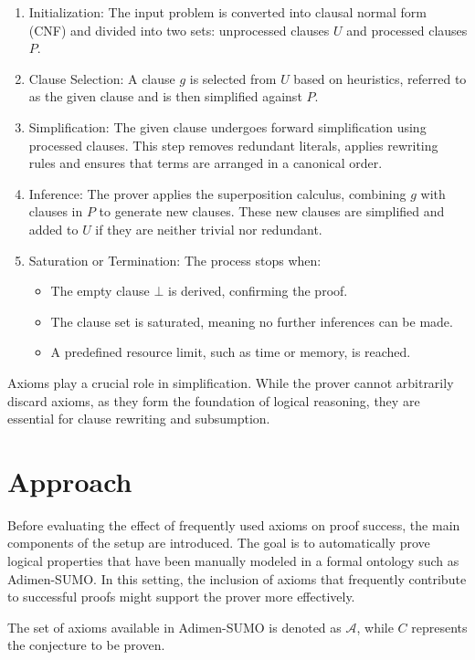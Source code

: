 \documentclass[english,version-2020-11]{uzl-thesis}
\begin{document}
\begin{enumerate}
    \item Initialization: The input problem is converted into clausal normal form (CNF) and divided into two sets: unprocessed clauses \( U \) and processed clauses \( P \).
    \item Clause Selection: A clause \( g \) is selected from \( U \) based on heuristics, referred to as the given clause and is then simplified against \( P \).
    \item Simplification: The given clause undergoes forward simplification using processed clauses. This step removes redundant literals, applies rewriting rules and ensures that terms are arranged in a canonical order.
    \item Inference: The prover applies the superposition calculus, combining \( g \) with clauses in \( P \) to generate new clauses. These new clauses are simplified and added to \( U \) if they are neither trivial nor redundant.
    \item Saturation or Termination: The process stops when:
    \begin{itemize}
        \item The empty clause \( \bot \) is derived, confirming the proof.
        \item The clause set is saturated, meaning no further inferences can be made.
        \item A predefined resource limit, such as time or memory, is reached.
    \end{itemize}
\end{enumerate}

Axioms play a crucial role in simplification. While the prover cannot arbitrarily discard axioms, as they form the foundation of logical reasoning, they are essential for clause rewriting and subsumption.


\section{Approach}

Before evaluating the effect of frequently used axioms on proof success, the main components of the setup are introduced. The goal is to automatically prove logical properties that have been manually modeled in a formal ontology such as Adimen-SUMO. In this setting, the inclusion of axioms that frequently contribute to successful proofs might support the prover more effectively.

The set of axioms available in Adimen-SUMO is denoted as \( \mathcal{A} \), while \( C \) represents the conjecture to be proven.
\end{document}
